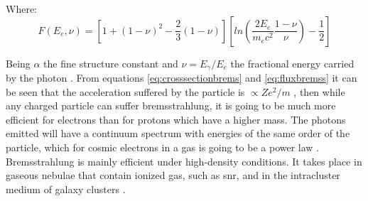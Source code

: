 \documentclass[main.tex]{subfiles}
\begin{document}
Where:
\begin{equation} \label{eq:fluxbremss}
    F(E_{e},\nu) = [1+(1-\nu)^2-\frac{2}{3}(1-\nu)]\left[ ln \left( \frac{2E_{e}}{m_{e}c^2} \frac{1-\nu}{\nu}\right)-\frac{1}{2}\right]
\end{equation}

Being $\alpha$ the fine structure constant and $\nu = E_{\gamma}/E_e$ the fractional energy carried by the photon \cite{1993MurthyGammaRay}. From equations \ref{eq:crosssectionbrems} and \ref{eq:fluxbremss} it can be seen that the acceleration suffered by the particle is $\propto Ze^2/m$ , then while any charged particle can suffer bremsstrahlung, it is going to be much more efficient for electrons  than for protons which have a higher mass.
The photons emitted will have a continuum spectrum with energies of the same order of the particle, which for cosmic electrons in a gas is going to be a power law \cite{weekes2003HEAstrophy}. Bremsstrahlung is mainly efficient under high-density conditions. It takes place in gaseous nebulae that contain ionized gas, such as \gls{snr}, and in the intracluster medium of galaxy clusters \cite{MaozNushellAstro}. 
\end{document}
